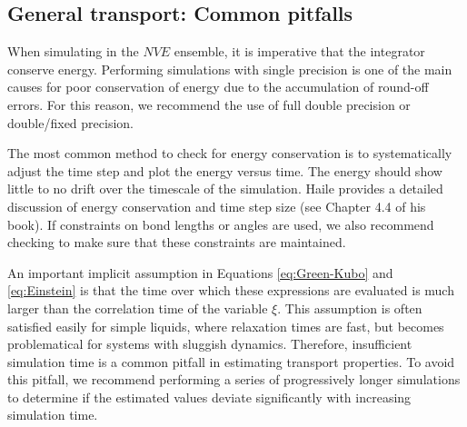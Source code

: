 \documentclass[9pt,bestpractices]{livecoms}
\begin{document}
%

\subsection{General transport: Common pitfalls} \label{sec:General: Common pitfalls}

When simulating in the $NVE$ ensemble, it is imperative that the integrator conserve energy. Performing simulations with single precision is one of the main causes for poor conservation of energy due to the accumulation of round-off errors. For this reason, we recommend the use of full double precision or double/fixed precision. 

The most common method to check for energy conservation is to systematically adjust the time step and plot the energy versus time. The energy should show little to no drift over the timescale of the simulation. Haile \cite{Haile1992} provides a detailed discussion of energy conservation and time step size (see Chapter 4.4 of his book). If constraints on bond lengths or angles are used, we also recommend checking to make sure that these constraints are maintained.


An important implicit assumption in Equations \ref{eq:Green-Kubo} and \ref{eq:Einstein} is that the time over which these expressions are evaluated is much larger than the correlation time of the variable $\xi$. This assumption is often satisfied easily for simple liquids, where relaxation times are fast, but becomes problematical for systems with sluggish dynamics. Therefore, insufficient simulation time is a common pitfall in estimating transport properties. To avoid this pitfall, we recommend performing a series of progressively longer simulations to determine if the estimated values deviate significantly with increasing simulation time. 
\end{document}
